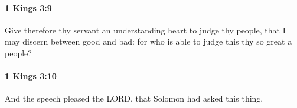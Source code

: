 		\paragraph{1 Kings 3:9} %
			\label{1KINGS-3-9}

			Give therefore thy servant an understanding heart to judge thy people, that I may discern between good and bad: for who is able to judge this thy so great a people?


		\paragraph{1 Kings 3:10} %
			\label{1KINGS-3-10}

			And the speech pleased the LORD, that Solomon had asked this thing.


